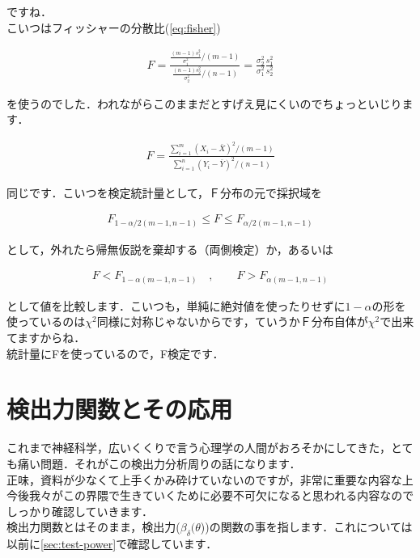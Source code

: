 \documentclass[11pt,a4paper]{ujreport} 	%
\begin{document}
ですね．\\

こいつはフィッシャーの分散比(\ref{eq:fisher})

\begin{align}
  F = \frac{\frac{(m-1)s_1^2}{\sigma_1^2} / (m-1)}{\frac{(n-1)s_2^2}{\sigma_2^2} / (n-1)} = \frac{\sigma_2^2}{\sigma_1^2}\frac{s_1^2}{s_2^2}
\end{align}

を使うのでした．われながらこのままだとすげえ見にくいのでちょっといじります．

\begin{align}
  F = \frac{\sum_{i=1}^m (X_i - \bar{X})^2/(m-1)}{\sum_{i=1}^n (Y_i - \bar{Y})^2/(n-1)}
\end{align}

同じです．こいつを検定統計量として，Ｆ分布の元で採択域を

\begin{align}
  F_{1-\alpha/2(m-1,n-1)} \leq F \leq F_{\alpha/2(m-1,n-1)}
\end{align}

として，外れたら帰無仮説を棄却する（両側検定）か，あるいは

\begin{align}
  F < F_{1-\alpha(m-1,n-1)} \quad , \qquad F>F_{\alpha(m-1,n-1)}
\end{align}

として値を比較します．こいつも，単純に絶対値を使ったりせずに$1-\alpha$の形を使っているのは$\chi^2$同様に対称じゃないからです，ていうかＦ分布自体が$\chi^2$で出来てますからね．\\

統計量にFを使っているので，F検定です．

\section{検出力関数とその応用}

これまで神経科学，広いくくりで言う心理学の人間がおろそかにしてきた，とても痛い問題．それがこの検出力分析周りの話になります．\\

正味，資料が少なくて上手くかみ砕けていないのですが，非常に重要な内容な上今後我々がこの界隈で生きていくために必要不可欠になると思われる内容なのでしっかり確認していきます．\\

検出力関数とはそのまま，検出力($\beta_\delta(\theta$))の関数の事を指します．これについては以前に\ref{sec:test-power}で確認しています．
\end{document}

